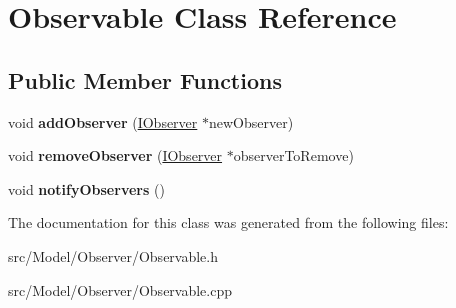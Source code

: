 \hypertarget{classObservable}{}\section{Observable Class Reference}
\label{classObservable}
\subsection*{Public Member Functions}
\begin{DoxyCompactItemize}
\item 
void {\bfseries add\+Observer} (\hyperlink{classIObserver}{I\+Observer} $\ast$new\+Observer)\hypertarget{classObservable_afb1b2b11f20deb216c4a82764a6e3710}{}\label{classObservable_afb1b2b11f20deb216c4a82764a6e3710}

\item 
void {\bfseries remove\+Observer} (\hyperlink{classIObserver}{I\+Observer} $\ast$observer\+To\+Remove)\hypertarget{classObservable_abd7c5a992fb90f73aa213ea68dc3d13b}{}\label{classObservable_abd7c5a992fb90f73aa213ea68dc3d13b}

\item 
void {\bfseries notify\+Observers} ()\hypertarget{classObservable_ad88b0ad8e623c5450ac3857daeb1c330}{}\label{classObservable_ad88b0ad8e623c5450ac3857daeb1c330}

\end{DoxyCompactItemize}


The documentation for this class was generated from the following files\+:\begin{DoxyCompactItemize}
\item 
src/\+Model/\+Observer/Observable.\+h\item 
src/\+Model/\+Observer/Observable.\+cpp\end{DoxyCompactItemize}
